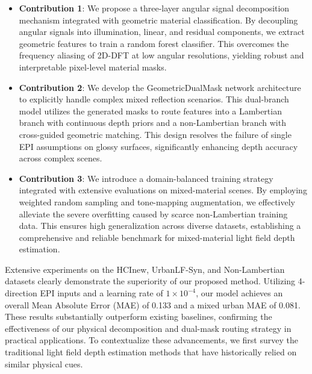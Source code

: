 \begin{itemize}
 \item \textbf{Contribution 1}: We propose a three-layer angular signal decomposition mechanism integrated with geometric material classification. By decoupling angular signals into illumination, linear, and residual components, we extract geometric features to train a random forest classifier. This overcomes the frequency aliasing of 2D-DFT at low angular resolutions, yielding robust and interpretable pixel-level material masks.
 \item \textbf{Contribution 2}: We develop the GeometricDualMask network architecture to explicitly handle complex mixed reflection scenarios. This dual-branch model utilizes the generated masks to route features into a Lambertian branch with continuous depth priors and a non-Lambertian branch with cross-guided geometric matching. This design resolves the failure of single EPI assumptions on glossy surfaces, significantly enhancing depth accuracy across complex scenes.
 \item \textbf{Contribution 3}: We introduce a domain-balanced training strategy integrated with extensive evaluations on mixed-material scenes. By employing weighted random sampling and tone-mapping augmentation, we effectively alleviate the severe overfitting caused by scarce non-Lambertian training data. This ensures high generalization across diverse datasets, establishing a comprehensive and reliable benchmark for mixed-material light field depth estimation.
\end{itemize}
Extensive experiments on the HCInew, UrbanLF-Syn, and Non-Lambertian datasets clearly demonstrate the superiority of our proposed method. Utilizing 4-direction EPI inputs and a learning rate of $1 \times 10^{-4}$, our model achieves an overall Mean Absolute Error (MAE) of 0.133 and a mixed urban MAE of 0.081. These results substantially outperform existing baselines, confirming the effectiveness of our physical decomposition and dual-mask routing strategy in practical applications. To contextualize these advancements, we first survey the traditional light field depth estimation methods that have historically relied on similar physical cues.